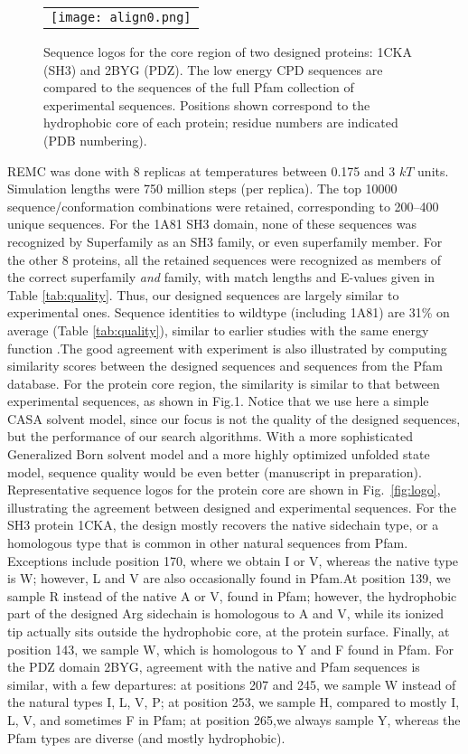 \begin{figure}[!htbp]
  \centering
      \begin{tabular}{c}
        \texttt{[image: align0.png]} 
      \end{tabular}
      \caption[width=1cm]{\small 
Sequence logos for the core region of two designed proteins: 1CKA (SH3) and 2BYG (PDZ).
The low energy CPD sequences are compared to the sequences of the full Pfam collection of
experimental sequences. Positions shown correspond to the hydrophobic core of each
protein; residue numbers are indicated (PDB numbering).
}
      \label{fig:logos}
\end{figure}



REMC was done with 8 replicas at temperatures between 0.175 and 3 $kT$
units. Simulation lengths were 750 million steps (per replica). The top 10000 sequence/conformation combinations were
retained, corresponding to 200--400 unique sequences. For the 1A81 SH3 domain, none of these sequences was recognized
by Superfamily as an SH3 family, or even superfamily member.
For the other 8 proteins, all the retained sequences were recognized as members of the correct superfamily {\it and}
family, with match lengths and E-values given in Table \ref{tab:quality}. Thus, our designed sequences are largely
similar to experimental ones. Sequence identities to wildtype (including 1A81) are 31\% on average (Table
\ref{tab:quality}), similar to earlier studies with the same energy function \cite{Schmidt09,Schmidt10}.The good
agreement with experiment is also illustrated by computing similarity scores between the
designed sequences and sequences from the Pfam database. For the protein core region, the similarity is similar to that between experimental sequences, as shown in Fig.1. Notice that we use here a simple CASA solvent model, since our focus is not the quality of the designed sequences, but the performance of our search algorithms. With a more
sophisticated Generalized Born solvent model and a more highly optimized unfolded state
model, sequence quality would be even better (manuscript in preparation).
Representative sequence logos for the protein core are shown in Fig.\ \ref{fig:logo}, illustrating the agreement
between designed and experimental sequences. For the SH3 protein 1CKA, the design mostly recovers the native sidechain type, or a homologous type that is common in other natural sequences from Pfam. Exceptions include position 170, where we obtain I or V, whereas the native type is W; however, L and V are also occasionally found in Pfam.At position 139, we sample R instead of the native A or V, found in Pfam; however, the hydrophobic part of the designed Arg sidechain is homologous to A and V, while its ionized tip actually sits outside the hydrophobic core, at the protein surface. Finally, at position 143, we sample W, which is homologous to Y and F found in Pfam. For the PDZ domain 2BYG, agreement with the native and Pfam sequences is similar, with a few departures: at positions 207 and 245, we sample W instead of the natural types I, L, V, P; at position 253, we sample H, compared to mostly I, L, V, and sometimes F in Pfam; at position 265,we always sample Y, whereas the Pfam types are diverse (and mostly hydrophobic).

